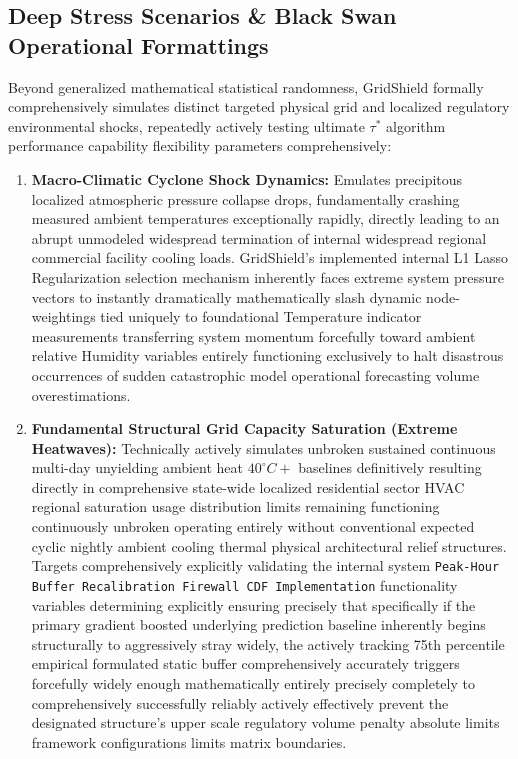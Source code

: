 \documentclass[11pt,a4paper]{article}
\begin{document}
\subsection{Deep Stress Scenarios \& Black Swan Operational Formattings}
Beyond generalized mathematical statistical randomness, GridShield formally comprehensively simulates distinct targeted physical grid and localized regulatory environmental shocks, repeatedly actively testing ultimate $\tau^*$ algorithm performance capability flexibility parameters comprehensively:
\begin{enumerate}
    \item \textbf{Macro-Climatic Cyclone Shock Dynamics:} Emulates precipitous localized atmospheric pressure collapse drops, fundamentally crashing measured ambient temperatures exceptionally rapidly, directly leading to an abrupt unmodeled widespread termination of internal widespread regional commercial facility cooling loads. GridShield's implemented internal L1 Lasso Regularization selection mechanism inherently faces extreme system pressure vectors to instantly dramatically mathematically slash dynamic node-weightings tied uniquely to foundational Temperature indicator measurements transferring system momentum forcefully toward ambient relative Humidity variables entirely functioning exclusively to halt disastrous occurrences of sudden catastrophic model operational forecasting volume overestimations.
    \item \textbf{Fundamental Structural Grid Capacity Saturation (Extreme Heatwaves):} Technically actively simulates unbroken sustained continuous multi-day unyielding ambient heat $40^\circ C+$ baselines definitively resulting directly in comprehensive state-wide localized residential sector HVAC regional saturation usage distribution limits remaining functioning continuously unbroken operating entirely without conventional expected cyclic nightly ambient cooling thermal physical architectural relief structures. Targets comprehensively explicitly validating the internal system \texttt{Peak-Hour Buffer Recalibration Firewall CDF Implementation} functionality variables determining explicitly ensuring precisely that specifically if the primary gradient boosted underlying prediction baseline inherently begins structurally to aggressively stray widely, the actively tracking 75th percentile empirical formulated static buffer comprehensively accurately triggers forcefully widely enough mathematically entirely precisely completely to comprehensively successfully reliably actively effectively prevent the designated structure's upper scale regulatory volume penalty absolute limits framework configurations limits matrix boundaries.

\end{enumerate}
\end{document}
